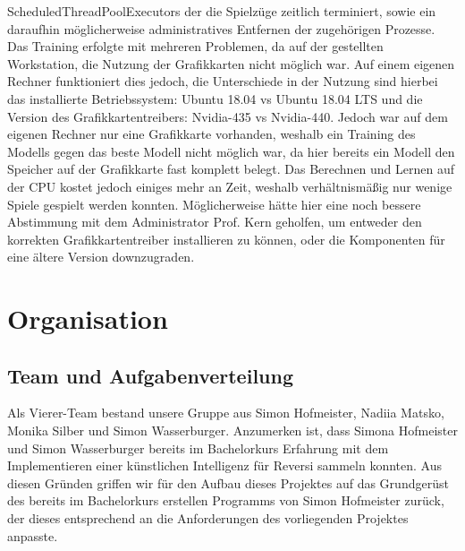 \documentclass[12pt,a4paper]{article}
\begin{document}
ScheduledThreadPoolExecutors der die Spielzüge zeitlich terminiert, sowie ein daraufhin möglicherweise administratives Entfernen der zugehörigen Prozesse. \\
Das Training erfolgte mit mehreren Problemen, da auf der gestellten Workstation, die Nutzung der Grafikkarten nicht möglich war. Auf einem eigenen Rechner funktioniert dies jedoch, die Unterschiede in der Nutzung sind hierbei das installierte Betriebssystem: Ubuntu 18.04 vs Ubuntu 18.04 LTS und die Version des Grafikkartentreibers: Nvidia-435 vs Nvidia-440. Jedoch war auf dem eigenen Rechner nur eine Grafikkarte vorhanden, weshalb ein Training des Modells gegen das beste Modell nicht möglich war, da hier bereits ein Modell den Speicher auf der Grafikkarte fast komplett belegt. Das Berechnen und Lernen auf der CPU kostet jedoch einiges mehr an Zeit, weshalb verhältnismäßig nur wenige Spiele gespielt werden konnten. Möglicherweise hätte hier eine noch bessere Abstimmung mit dem Administrator Prof. Kern geholfen, um entweder den korrekten Grafikkartentreiber installieren zu können, oder die Komponenten für eine ältere Version downzugraden.


\newpage

\section{Organisation}

\subsection{Team und Aufgabenverteilung}
Als Vierer-Team bestand unsere Gruppe aus Simon Hofmeister, Nadiia Matsko, Monika Silber und Simon Wasserburger. Anzumerken ist, dass Simona Hofmeister und Simon Wasserburger bereits im Bachelorkurs Erfahrung mit dem Implementieren einer künstlichen Intelligenz für Reversi sammeln konnten. Aus diesen Gründen griffen wir für den Aufbau dieses Projektes auf das Grundgerüst des bereits im Bachelorkurs erstellen Programms von Simon Hofmeister zurück, der dieses entsprechend an die Anforderungen des vorliegenden Projektes anpasste.
\end{document}

